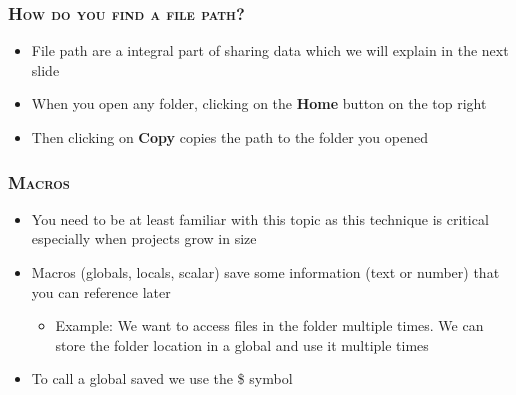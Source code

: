 \documentclass[10pt]{beamer}
\begin{document}
	\begin{frame}
		\frametitle{\textsc{How do you find a file path?}}		
		\begin{itemize}
			\item File path are a integral part of sharing data which we will explain in the next slide
		\end{itemize}
		\begin{figure}[H]
			\centering
		\end{figure}
		\begin{itemize}
			\item When you open any folder, clicking on the \textbf{Home} button on the top right
			\item Then clicking on \textbf{Copy} copies the path to the folder you opened
		\end{itemize}
	\end{frame}
	
	\begin{frame}
	\frametitle{\textsc{Macros}}

		\begin{itemize}
			\item You need to be at least familiar with this topic as this technique is critical especially when projects grow in size
			\item Macros (globals, locals, scalar) save some information 
				 (text or number) that you can reference later
				\begin{itemize}
					\item Example: We want to access files in the folder 
								   multiple times. We can store the folder 
								   location in a global and use it multiple times
				\end{itemize}
			\item To call a global saved we use the \$ symbol
		\end{itemize}
	\end{frame}	
	
\end{document}
